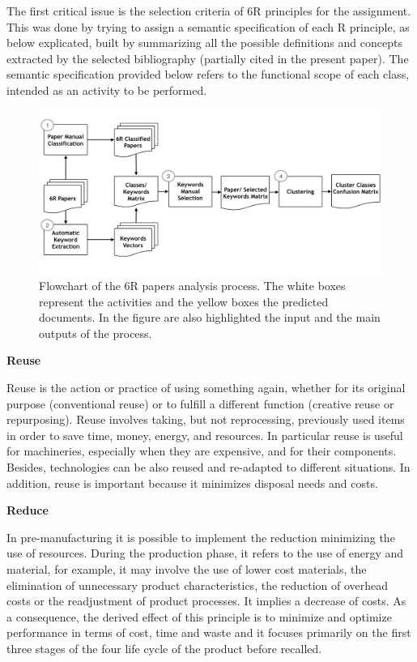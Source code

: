 \documentclass[]{book}
\theoremstyle{definition}
\theoremstyle{definition}
\theoremstyle{definition}
\theoremstyle{remark}
\begin{document}
The first critical issue is the selection criteria of 6R principles for
the assignment. This was done by trying to assign a semantic
specification of each R principle, as below explicated, built by
summarizing all the possible definitions and concepts extracted by the
selected bibliography (partially cited in the present paper). The
semantic specification provided below refers to the functional scope of
each class, intended as an activity to be performed.

\begin{figure}

{\centering \includegraphics[width=0.8\linewidth]{_bookdown_files/figures/workflow_sm} 

}

\caption{Flowchart of the 6R papers analysis process. The white boxes represent the activities and the yellow boxes the predicted documents. In the figure are also highlighted the input and the main outputs of the process.}\label{fig:wfsm}
\end{figure}

\textbf{Reuse}

Reuse is the action or practice of using something again, whether for
its original purpose (conventional reuse) or to fulfill a different
function (creative reuse or repurposing). Reuse involves taking, but not
reprocessing, previously used items in order to save time, money,
energy, and resources. In particular reuse is useful for machineries,
especially when they are expensive, and for their components. Besides,
technologies can be also reused and re-adapted to different situations.
In addition, reuse is important because it minimizes disposal needs and
costs.

\textbf{Reduce}

In pre-manufacturing it is possible to implement the reduction
minimizing the use of resources. During the production phase, it refers
to the use of energy and material, for example, it may involve the use
of lower cost materials, the elimination of unnecessary product
characteristics, the reduction of overhead costs or the readjustment of
product processes. It implies a decrease of costs. As a consequence, the
derived effect of this principle is to minimize and optimize performance
in terms of cost, time and waste and it focuses primarily on the first
three stages of the four life cycle of the product before recalled.
\end{document}
